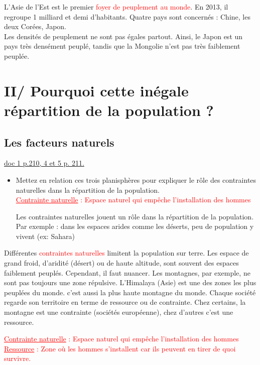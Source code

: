 \documentclass{beamer}
\begin{document}
\begin{frame}
\setlength{\parindent}{1cm} L'Asie de l'Est est le premier \textcolor{red}{foyer de peuplement au monde}. En 2013, il regroupe 1 milliard et demi d'habitants. Quatre pays sont concernés : Chine, les deux Corées, Japon.\\
\setlength{\parindent}{1cm} Les densités de peuplement ne sont pas égales partout. Ainsi, le Japon est un pays très densément peuplé, tandis que la Mongolie n'est pas très faiblement peuplée.
\end{frame}


\section{II/ Pourquoi cette inégale répartition de la population ?}
\subsection{Les facteurs naturels}

\begin{frame}
\underline{doc 1 p.210, 4 et 5 p. 211.}
\begin{itemize}
\item Mettez en relation ces trois planisphères pour expliquer le rôle des contraintes naturelles dans la répartition de la population.\\

\vfill\textcolor{red}{\underline{Contrainte naturelle} : Espace naturel qui empêche l'installation des hommes}

\pause \textcolor{black!70!green}{Les contraintes naturelles jouent un rôle dans la répartition de la population. Par exemple : dans les espaces arides comme les déserts, peu de population y vivent (ex: Sahara)}
\end{itemize}
\end{frame}

\begin{frame}
\setlength{\parindent}{1cm}Différentes \textcolor{red}{contraintes naturelles} limitent la population sur terre. Les espace de grand froid, d'aridité (désert) ou de haute altitude, sont souvent des espaces faiblement peuplés.
\vfill
\setlength{\parindent}{1cm}Cependant, il faut nuancer. Les montagnes, par exemple, ne sont pas toujours une zone répulsive. L'Himalaya (Asie) est une des zones les plus peuplées du monde. c'est aussi la plus haute montagne du monde.
\vfill
\setlength{\parindent}{1cm} Chaque société regarde son territoire en terme de ressource ou de contrainte. Chez certains, la montagne est une contrainte (sociétés européenne), chez d'autres c'est une ressource.

\vfill\textcolor{red}{\underline{Contrainte naturelle} : Espace naturel qui empêche l'installation des hommes}
\vfill\textcolor{red}{\underline{Ressource} : Zone où les hommes s'installent car ils peuvent en tirer de quoi survivre.}
\end{frame}
\end{document}
